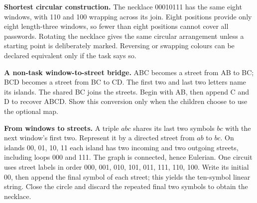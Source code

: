 \documentclass[11pt]{article}
\newcommand{\labelled}[2]{\textbf{#1} #2\par}
\begin{document}
\labelled{Shortest circular construction.}{The necklace 00010111 has the same eight windows, with 110 and 100 wrapping across its join. Eight positions provide only eight length-three windows, so fewer than eight positions cannot cover all passwords. Rotating the necklace gives the same circular arrangement unless a starting point is deliberately marked. Reversing or swapping colours can be declared equivalent only if the task says so.}
\labelled{A non-task window-to-street bridge.}{ABC becomes a street from AB to BC; BCD becomes a street from BC to CD. The first two and last two letters name its islands. The shared BC joins the streets. Begin with AB, then append C and D to recover ABCD. Show this conversion only when the children choose to use the optional map.}
\begin{center}
\end{center}
\labelled{From windows to streets.}{A triple $abc$ shares its last two symbols $bc$ with the next window's first two. Represent it by a directed street from $ab$ to $bc$. On islands 00, 01, 10, 11 each island has two incoming and two outgoing streets, including loops 000 and 111. The graph is connected, hence Eulerian. One circuit uses street labels in order 000, 001, 010, 101, 011, 111, 110, 100. Write its initial 00, then append the final symbol of each street; this yields the ten-symbol linear string. Close the circle and discard the repeated final two symbols to obtain the necklace.}
\end{document}
